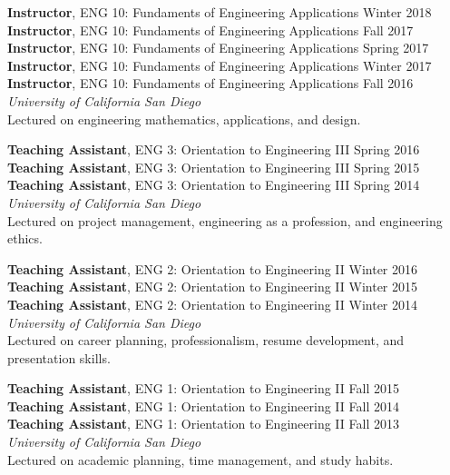\documentclass[10pt]{res}
\begin{document}
\begin{resume}
\textbf{Instructor}, ENG 10: Fundaments of Engineering Applications \hfill Winter 2018 \\
\textbf{Instructor}, ENG 10: Fundaments of Engineering Applications \hfill Fall 2017 \\
\textbf{Instructor}, ENG 10: Fundaments of Engineering Applications \hfill Spring 2017 \\
\textbf{Instructor}, ENG 10: Fundaments of Engineering Applications \hfill Winter 2017 \\
\textbf{Instructor}, ENG 10: Fundaments of Engineering Applications \hfill Fall 2016 \\
\textit{University of California San Diego} \\
Lectured on engineering mathematics, applications, and design.

\textbf{Teaching Assistant}, ENG 3: Orientation to Engineering III \hfill Spring 2016 \\
\textbf{Teaching Assistant}, ENG 3: Orientation to Engineering III \hfill Spring 2015 \\
\textbf{Teaching Assistant}, ENG 3: Orientation to Engineering III \hfill Spring 2014 \\
\textit{University of California San Diego} \\
Lectured on project management, engineering as a profession, and engineering ethics.

\textbf{Teaching Assistant}, ENG 2: Orientation to Engineering II \hfill Winter 2016 \\
\textbf{Teaching Assistant}, ENG 2: Orientation to Engineering II \hfill Winter 2015 \\
\textbf{Teaching Assistant}, ENG 2: Orientation to Engineering II \hfill Winter 2014 \\
\textit{University of California San Diego} \\
Lectured on career planning, professionalism, resume development, and presentation skills.

\textbf{Teaching Assistant}, ENG 1: Orientation to Engineering II \hfill Fall 2015 \\
\textbf{Teaching Assistant}, ENG 1: Orientation to Engineering II \hfill Fall 2014 \\
\textbf{Teaching Assistant}, ENG 1: Orientation to Engineering II \hfill Fall 2013 \\
\textit{University of California San Diego} \\
Lectured on academic planning, time management, and study habits.




\end{resume}
\end{document}
